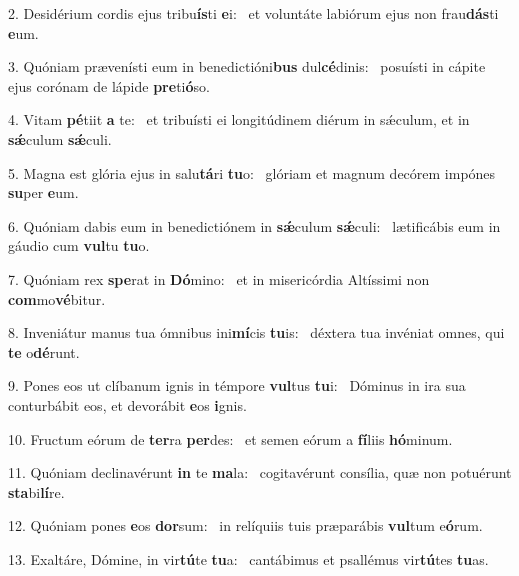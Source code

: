 2. Desidérium cordis ejus tribu\textbf{ís}ti \textbf{e}i: \ast\  et voluntáte labiórum ejus non frau\textbf{dás}ti \textbf{e}um.\

3. Quóniam prævenísti eum in benedictióni\textbf{bus} dul\textbf{cé}dinis: \ast\  posuísti in cápite ejus corónam de lápide \textbf{pre}ti\textbf{ó}so.\

4. Vitam \textbf{pé}tiit \textbf{a} te: \ast\  et tribuísti ei longitúdinem diérum in sǽculum, et in \textbf{sǽ}culum \textbf{sǽ}culi.\

5. Magna est glória ejus in salu\textbf{tá}ri \textbf{tu}o: \ast\  glóriam et magnum decórem impónes \textbf{su}per \textbf{e}um.\

6. Quóniam dabis eum in benedictiónem in \textbf{sǽ}culum \textbf{sǽ}culi: \ast\  lætificábis eum in gáudio cum \textbf{vul}tu \textbf{tu}o.\

7. Quóniam rex \textbf{spe}rat in \textbf{Dó}mino: \ast\  et in misericórdia Altíssimi non \textbf{com}mo\textbf{vé}bitur.\

8. Inveniátur manus tua ómnibus ini\textbf{mí}cis \textbf{tu}is: \ast\  déxtera tua invéniat omnes, qui \textbf{te} o\textbf{dé}runt.\

9. Pones eos ut clíbanum ignis in témpore \textbf{vul}tus \textbf{tu}i: \ast\  Dóminus in ira sua conturbábit eos, et devorábit \textbf{e}os \textbf{i}gnis.\

10. Fructum eórum de \textbf{ter}ra \textbf{per}des: \ast\  et semen eórum a \textbf{fí}liis \textbf{hó}minum.\

11. Quóniam declinavérunt \textbf{in} te \textbf{ma}la: \ast\  cogitavérunt consília, quæ non potuérunt \textbf{sta}bi\textbf{lí}re.\

12. Quóniam pones \textbf{e}os \textbf{dor}sum: \ast\  in relíquiis tuis præparábis \textbf{vul}tum e\textbf{ó}rum.\

13. Exaltáre, Dómine, in vir\textbf{tú}te \textbf{tu}a: \ast\  cantábimus et psallémus vir\textbf{tú}tes \textbf{tu}as.\

